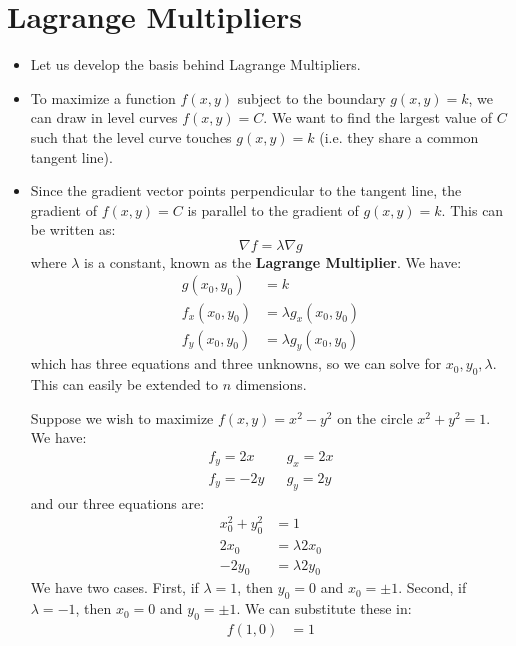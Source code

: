 \section{Lagrange Multipliers}
\begin{itemize}
    \item Let us develop the basis behind Lagrange Multipliers.
    \item To maximize a function $f(x,y)$ subject to the boundary $g(x,y) = k$, we can draw in level curves $f(x,y) = C$. We want to find the largest value of $C$ such that the level curve touches $g(x,y)=k$ (i.e. they share a common tangent line).
    \item Since the gradient vector points perpendicular to the tangent line, the gradient of $f(x,y)=C$ is parallel to the gradient of $g(x,y) = k$. This can be written as:
    \begin{equation}
        \nabla f = \lambda \nabla g
    \end{equation}
    where $\lambda$ is a constant, known as the \textbf{Lagrange Multiplier}. We have:
    \begin{align}
        g(x_0, y_0) &= k \\ 
        f_x(x_0, y_0) &= \lambda g_x(x_0, y_0) \\ 
        f_y(x_0, y_0) &= \lambda g_y(x_0, y_0)
    \end{align}
    which has three equations and three unknowns, so we can solve for $x_0, y_0, \lambda$. This can easily be extended to $n$ dimensions.
    \begin{example}
        Suppose we wish to maximize $f(x,y) = x^2 - y^2$ on the circle $x^2 + y^2 = 1$.
        We have:
        \begin{align}
            f_y = 2x && g_x = 2x \\ 
            f_y = -2y && g_y = 2y
        \end{align}
        and our three equations are:
        \begin{align}
            x_0^2 + y_0^2 &= 1 \\ 
            2x_0 &= \lambda 2x_0 \\ 
            -2y_0 &= \lambda 2y_0
        \end{align}
        We have two cases. First, if $\lambda=1$, then $y_0 = 0$ and $x_0 = \pm 1$. Second, if $\lambda = -1$, then $x_0 = 0$ and $y_0 = \pm 1$. We can substitute these in:
        \begin{align}
            f(1,0) &= 1 \\ 

\end{align}
\end{example}
\end{itemize}
